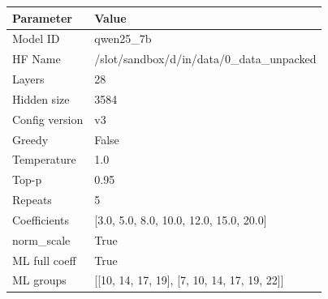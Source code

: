 \begin{tabular}{ll}
\toprule
Parameter & Value \\
\midrule
Model ID & qwen25_7b \\
HF Name & /slot/sandbox/d/in/data/0_data_unpacked \\
Layers & 28 \\
Hidden size & 3584 \\
Config version & v3 \\
Greedy & False \\
Temperature & 1.0 \\
Top-p & 0.95 \\
Repeats & 5 \\
Coefficients & [3.0, 5.0, 8.0, 10.0, 12.0, 15.0, 20.0] \\
norm\_scale & True \\
ML full coeff & True \\
ML groups & [[10, 14, 17, 19], [7, 10, 14, 17, 19, 22]] \\
\bottomrule
\end{tabular}
